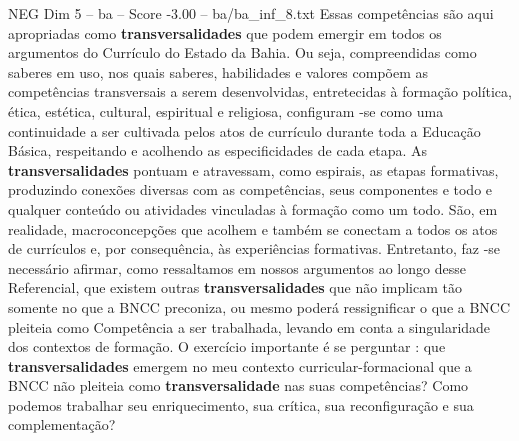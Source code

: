 \begin{textsample}{NEG Dim 5 – ba – Score -3.00 – ba/ba\_inf\_8.txt}
Essas competências são aqui apropriadas como \textbf{transversalidades} que podem emergir em todos os argumentos do Currículo do Estado da Bahia.
Ou seja, compreendidas como saberes em uso, nos quais saberes, habilidades e valores compõem as competências transversais a serem desenvolvidas, entretecidas à formação política, ética, estética, cultural, espiritual e religiosa, configuram -se como uma continuidade a ser cultivada pelos atos de currículo durante toda a Educação Básica, respeitando e acolhendo as especificidades de cada etapa.
As \textbf{transversalidades} pontuam e atravessam, como espirais, as etapas formativas, produzindo conexões diversas com as competências, seus componentes e todo e qualquer conteúdo ou atividades vinculadas à formação como um todo.
São, em realidade, macroconcepções que acolhem e também se conectam a todos os atos de currículos e, por consequência, às experiências formativas.
Entretanto, faz -se necessário afirmar, como ressaltamos em nossos argumentos ao longo desse Referencial, que existem outras \textbf{transversalidades} que não implicam tão somente no que a BNCC preconiza, ou mesmo poderá ressignificar o que a BNCC pleiteia como Competência a ser trabalhada, levando em conta a singularidade dos contextos de formação.
O exercício importante é se perguntar : que \textbf{transversalidades} emergem no meu contexto curricular-formacional que a BNCC não pleiteia como \textbf{transversalidade} nas suas competências?
Como podemos trabalhar seu enriquecimento, sua crítica, sua reconfiguração e sua complementação?

\end{textsample}
